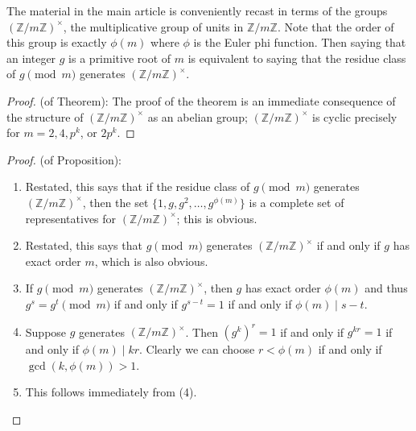 \documentclass[12pt]{article}
\newcommand{\Ints}{\mathbb{Z}}
\newcommand{\UI}[1]{(\Ints/{#1}\Ints)^{\times}}
\begin{document}
The material in the main article is conveniently recast in terms of the groups $\UI{m}$, the multiplicative group of units in $\Ints/m\Ints$. Note that the order of this group is exactly $\phi(m)$ where $\phi$ is the Euler phi function. Then saying that an integer $g$ is a primitive root of $m$ is equivalent to saying that the residue class of $g \pmod m$ generates $\UI{m}$.

\begin{proof}(of Theorem):
\newline
The proof of the theorem is an immediate consequence of the structure of $\UI{m}$ as an abelian group; $\UI{m}$ is cyclic precisely for $m=2, 4, p^k$, or $2p^k$.
\end{proof}

\begin{proof}(of Proposition):

\begin{enumerate}
\item Restated, this says that if the residue class of $g\pmod m$ generates $\UI{m}$, then the set $\{1,g,g^2,\ldots,g^{\phi(m)}\}$ is a complete set of representatives for $\UI{m}$; this is obvious.

\item Restated, this says that $g\pmod m$ generates $\UI{m}$ if and only if $g$ has exact order $m$, which is also obvious.

\item If $g\pmod m$ generates $\UI{m}$, then $g$ has exact order $\phi(m)$ and thus $g^s=g^t\pmod m$ if and only if $g^{s-t}=1$ if and only if $\phi(m)\mid s-t$.

\item Suppose $g$ generates $\UI{m}$. Then $(g^k)^r=1$ if and only if $g^{kr}=1$ if and only if $\phi(m)\mid kr$. Clearly we can choose $r<\phi(m)$ if and only if $\gcd(k,\phi(m))>1$.

\item This follows immediately from (4).\qedhere
\end{enumerate}
\end{proof}

\end{document}
